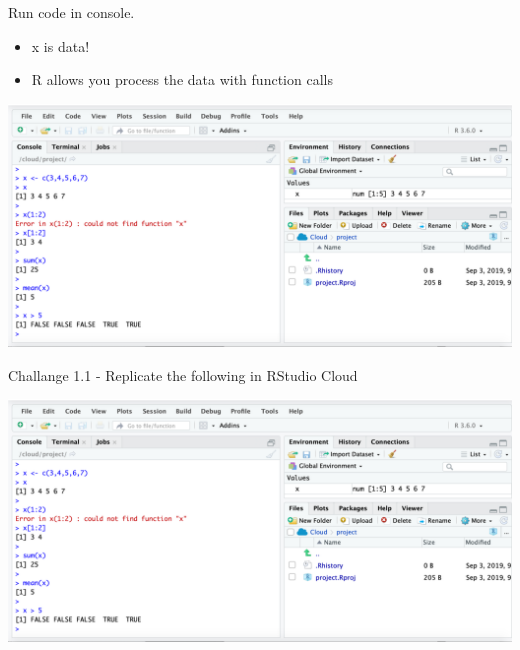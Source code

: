 \documentclass[ignorenonframetext,]{beamer}
\providecommand{\tightlist}{%
  \setlength{\itemsep}{0pt}\setlength{\parskip}{0pt}}
\begin{document}
\begin{frame}{Run code in console.}
\protect\hypertarget{run-code-in-console.}{}

\begin{itemize}
\tightlist
\item
  x is data!
\item
  R allows you process the data with function calls
\end{itemize}

\includegraphics[width=1\linewidth]{images/05 Run Code}

\end{frame}

\begin{frame}{Challange 1.1 - Replicate the following in RStudio Cloud}
\protect\hypertarget{challange-1.1---replicate-the-following-in-rstudio-cloud}{}

\includegraphics[width=1\linewidth]{images/05 Run Code}

\end{frame}
\end{document}
